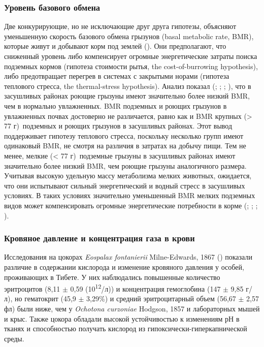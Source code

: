 \subsubsection{Уровень базового обмена}


Две конкурирующие, но не исключающие друг друга гипотезы, объясняют уменьшенную скорость базового обмена грызунов (basal metabolic rate, BMR), которые живут и добывают корм под землей (\cite{White2003}). Они предполагают, что сниженный уровень либо компенсирует огромные энергетические затраты поиска подземных кормов (гипотеза стоимости рытья, the cost-of-burrowing hypothesis), либо предотвращает перегрев в системах с закрытыми норами (гипотеза теплового стресса, the thermal-stress hypothesis). Анализ показал (\cite{White2003}; \cite{McNab1966}; \cite{Vleck1979}; \cite{Gorecki1969}), что в засушливых районах роющие грызуны имеют значительно более низкий BMR, чем в нормально увлажненных. BMR подземных и роющих грызунов в увлажненных почвах достоверно не различается, равно как и BMR крупных (> 77 г) подземных и роющих грызунов в засушливых районах. Этот вывод поддерживает гипотезу теплового стресса, поскольку несколько групп имеют одинаковый BMR, не смотря на различия в затратах на добычу пищи. Тем не менее, мелкие (< 77 г) подземные грызуны в засушливых районах имеют значительно более низкий BMR, чем роющие грызуны аналогичного размера. Учитывая высокую удельную массу метаболизма мелких животных, ожидается, что они испытывают сильный энергетический и водный стресс в засушливых условиях. В таких условиях значительно уменьшенный BMR мелких подземных видов может компенсировать огромные энергетические потребности в корме (\cite{White2003}; \cite{McNab1966}; \cite{Vleck1979}; \cite{Gorecki1969}). 

\subsubsection{Кровяное давление и концентрация газа в крови}


Исследования на цокорах \textit{Eospalax fontanierii} Milne-Edwards, 1867 (\cite{Wei2006}) показали различие в содержании кислорода и изменение кровяного давления у особей, проживающих в Тибете. У них наблюдались повышенные количество эритроцитов (8,11 $\pm$ 0,59 (10\textsuperscript{12}/л)) и концентрация гемоглобина (147 $\pm$ 9,85 г/л), но гематокрит (45,9 $\pm$ 3,29\%) и средний эритроцитарный объем (56,67 $\pm$ 2,57 фл) были ниже, чем у \textit{Ochotona curzoniae} Hodgson, 1857 и лабораторных мышей и крыс. Также цокора обладали высокой устойчивостью к изменениям рН в тканях и способностью получать кислород из гипоксически-гиперкапнической среды. 

